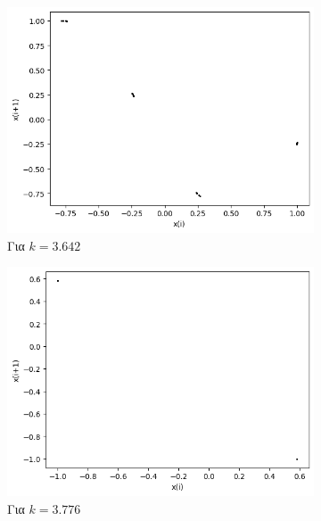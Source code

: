 \begin{figure}[ht]
	\centering
		\begin{subfigure}[b]{0.4\textwidth}
		\centering
		\includegraphics[width=\textwidth]{LateX images/cheb q=0.8/g10}
		\caption{Για $k=3.642$}
		\label{f:k137}
	\end{subfigure}
	\hfill	
	\begin{subfigure}[b]{0.4\textwidth}
		\centering
		\includegraphics[width=\textwidth]{LateX images/cheb q=0.8/g11}
		\caption{Για $k=3.776$}
		\label{f:k138}
	\end{subfigure}
	\hfill
	\begin{subfigure}[b]{0.4\textwidth}
		\centering

\end{subfigure}
\end{figure}
